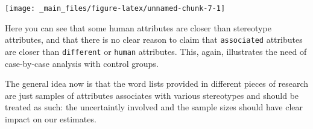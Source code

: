 \documentclass[12pt,]{book}
\newenvironment{Shaded}{\begin{snugshade}}{\end{snugshade}}
\newcommand{\KeywordTok}[1]{\textcolor[rgb]{0.13,0.29,0.53}{\textbf{#1}}}
\newcommand{\DecValTok}[1]{\textcolor[rgb]{0.00,0.00,0.81}{#1}}
\newcommand{\StringTok}[1]{\textcolor[rgb]{0.31,0.60,0.02}{#1}}
\newcommand{\CommentTok}[1]{\textcolor[rgb]{0.56,0.35,0.01}{\textit{#1}}}
\newcommand{\OperatorTok}[1]{\textcolor[rgb]{0.81,0.36,0.00}{\textbf{#1}}}
\newcommand{\NormalTok}[1]{#1}
\begin{document}
\vspace{1mm} \footnotesize

\begin{Shaded}
\end{Shaded}

\begin{center}\texttt{[image: \_main\_files/figure-latex/unnamed-chunk-7-1]} \end{center}

\normalsize

\noindent Here you can see that some human attributes are closer than
stereotype attributes, and that there is no clear reason to claim that
\texttt{associated} attributes are closer than \texttt{different} or
\texttt{human} attributes. This, again, illustrates the need of
case-by-case analysis with control groups.

The general idea now is that the word lists provided in different pieces
of research are just samples of attributes associates with various
stereotypes and should be treated as such: the uncertaintly involved and
the sample sizes should have clear impact on our estimates.
\end{document}
